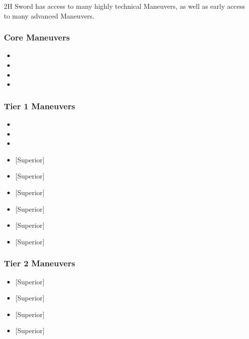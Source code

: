 \documentclass[oneside,11pt,english]{book}
\begin{document}
2H Sword has access to many highly technical Maneuvers, as well as early access to many advanced Maneuvers. 

\subsubsection{Core Maneuvers}
\vspace{-5pt}\begin{itemize}
  [itemsep=0.5mm]
\item {}
\item {}
\item {}
\item {}
\end{itemize}
\subsubsection{Tier 1 Maneuvers}
\vspace{-5pt}\begin{itemize}
  [itemsep=0.5mm]
\item {}
\item {}
\item {}
\item {} [Superior]
\item {} [Superior]
\item {} [Superior]
\item {} [Superior]
\item {} [Superior]
\item {} [Superior]
\end{itemize}
\subsubsection{Tier 2 Maneuvers}
\vspace{-5pt}\begin{itemize}
  [itemsep=0.5mm]
\item {} [Superior]
\item {} [Superior]
\item {} [Superior]
\item {} [Superior]
\end{itemize}
\end{document}
